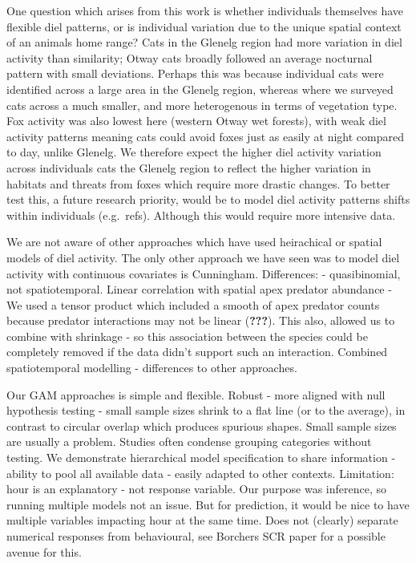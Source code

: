 \documentclass[11pt,a4paper,titlepage,twoside,openright]{style/unimelbthesis}
\begin{document}
\begin{mainmatter}
One question which arises from this work is whether individuals themselves have flexible diel patterns, or is individual variation due to the unique spatial context of an animals home range? Cats in the Glenelg region had more variation in diel activity than similarity; Otway cats broadly followed an average nocturnal pattern with small deviations. Perhaps this was because individual cats were identified across a large area in the Glenelg region, whereas where we surveyed cats across a much smaller, and more heterogenous in terms of vegetation type. Fox activity was also lowest here (western Otway wet forests), with weak diel activity patterns meaning cats could avoid foxes just as easily at night compared to day, unlike Glenelg. We therefore expect the higher diel activity variation across individuals cats the Glenelg region to reflect the higher variation in habitats and threats from foxes which require more drastic changes. To better test this, a future research priority, would be to model diel activity patterns shifts within individuals (e.g.~refs). Although this would require more intensive data.

We are not aware of other approaches which have used heirachical or spatial models of diel activity. The only other approach we have seen was to model diel activity with continuous covariates is Cunningham. Differences: - quasibinomial, not spatiotemporal. Linear correlation with spatial apex predator abundance - We used a tensor product which included a smooth of apex predator counts because predator interactions may not be linear ({\textbf{???}}). This also, allowed us to combine with shrinkage - so this association between the species could be completely removed if the data didn't support such an interaction. Combined spatiotemporal modelling - differences to other approaches.

Our GAM approaches is simple and flexible. Robust - more aligned with null hypothesis testing - small sample sizes shrink to a flat line (or to the average), in contrast to circular overlap which produces spurious shapes. Small sample sizes are usually a problem. Studies often condense grouping categories without testing. We demonstrate hierarchical model specification to share information - ability to pool all available data - easily adapted to other contexts. Limitation: hour is an explanatory - not response variable. Our purpose was inference, so running multiple models not an issue. But for prediction, it would be nice to have multiple variables impacting hour at the same time. Does not (clearly) separate numerical responses from behavioural, see Borchers SCR paper for a possible avenue for this.


\end{mainmatter}
\end{document}
